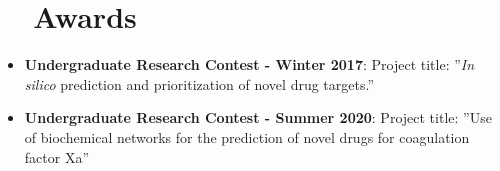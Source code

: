 \documentclass[letter,20pt]{article}
\newcommand{\resumeItem}[2]{
  \item\small{
    \textbf{#1}{: #2 \vspace{-2pt}}
  }
}
\newcommand{\resumeItemWithoutTitle}[1]{
  \item\small{
    {\vspace{-2pt}}
  }
}
\newcommand{\resumeSubItem}[2]{\resumeItem{#1}{#2}\vspace{-3pt}}
\newcommand{\resumeSubHeadingListStart}{\begin{itemize}[leftmargin=*]}
\newcommand{\resumeSubHeadingListEnd}{\end{itemize}}
\begin{document}
\section{~~Awards}
\resumeSubHeadingListStart
\resumeSubItem{Undergraduate Research Contest - Winter 2017}{Project title: ''\textit{In silico} prediction and prioritization of novel drug targets.''}
\resumeSubItem{Undergraduate Research Contest - Summer 2020}{Project title: ''Use of biochemical networks for the prediction of novel drugs for coagulation factor Xa''}
\vspace{2pt}
\resumeSubHeadingListEnd
\end{document}
